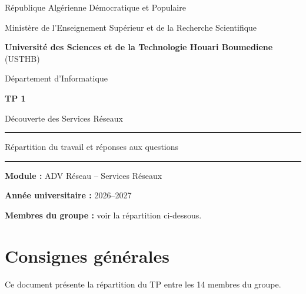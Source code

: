 \documentclass[12pt,a4paper]{article}
\newcommand{\matiere}{Services Réseaux}
\newcommand{\universite}{USTHB}
\newcommand{\annee}{2026--2027}
\begin{document}
\begin{titlepage}
    \centering

    {\large République Algérienne Démocratique et Populaire \par}
    \vspace{0.2cm}
    {\large Ministère de l'Enseignement Supérieur et de la Recherche Scientifique \par}
    \vspace{0.6cm}
    {\Large \textbf{Université des Sciences et de la Technologie Houari Boumediene} (\universite) \par}
    \vspace{0.2cm}
    {\large Département d'Informatique \par}
    \vspace{1.5cm}

    {\Huge\bfseries TP 1 \par}
    \vspace{0.5cm}

    {\LARGE Découverte des Services Réseaux \par}
    \vspace{1.5cm}

    \rule{\textwidth}{0.5pt}

    \vspace{0.7cm}
    {\large Répartition du travail et réponses aux questions \par}
    \vspace{0.7cm}

    \rule{\textwidth}{0.5pt}

    \vspace{1.5cm}

    \textbf{Module :} ADV Réseau -- \matiere

    \textbf{Année universitaire :} \annee

    \vfill

    \textbf{Membres du groupe :} voir la répartition ci-dessous.

    \vfill
\end{titlepage}

\tableofcontents
\newpage

\section{Consignes générales}

Ce document présente la répartition du TP entre les
14 membres du groupe.
\end{document}

